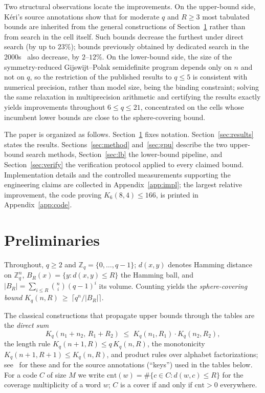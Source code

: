 \documentclass[11pt]{amsart}
\newcommand{\Kq}[3]{K_{#1}(#2,#3)}
\newcommand{\Zq}{\mathbb{Z}_q}
\begin{document}
Two structural observations locate the improvements. On the upper-bound
side, K\'eri's source annotations show that for moderate $q$ and $R\ge 3$
most tabulated bounds are inherited from the general constructions of
Section~\ref{sec:prelim} rather than from search in the cell itself. Such
bounds decrease the furthest under direct search (by up to $23\%$); bounds
previously obtained by dedicated search in the
2000s~\cite{KeriOstergard2005} also decrease, by $2$--$12\%$. On the lower-bound side, the size of the symmetry-reduced
Gijswijt--Polak semidefinite program depends only on $n$ and not on $q$, so
the restriction of the published results to $q\le 5$ is consistent with
numerical precision, rather than model size, being the binding
constraint; solving the same relaxation in
multiprecision arithmetic and certifying the results exactly yields
improvements throughout $6\le q\le 21$, concentrated on the cells whose
incumbent lower bounds are close to the sphere-covering bound.

The paper is organized as follows. Section~\ref{sec:prelim} fixes notation.
Section~\ref{sec:results} states the results.
Sections~\ref{sec:method} and~\ref{sec:gpu} describe the two upper-bound
search methods, Section~\ref{sec:lb} the lower-bound pipeline, and
Section~\ref{sec:verify} the verification protocol applied to every claimed
bound. Implementation details and the controlled measurements supporting
the engineering claims are collected in Appendix~\ref{app:impl}; the
largest relative improvement, the code proving $\Kq{6}{8}{4}\le 166$, is
printed in Appendix~\ref{app:code}.

\section{Preliminaries}\label{sec:prelim}

Throughout, $q\ge 2$ and $\Zq=\{0,\dots,q-1\}$; $d(x,y)$ denotes Hamming
distance on $\Zq^n$, $B_R(x)=\{y: d(x,y)\le R\}$ the Hamming ball, and
$|B_R|=\sum_{i\le R}\binom{n}{i}(q-1)^i$ its volume. Counting yields the
\emph{sphere-covering bound}
$K_q(n,R)\ \ge\ \lceil q^n/|B_R|\rceil$.

The classical constructions that propagate upper bounds through the tables
are the \emph{direct sum}
\begin{equation}\label{eq:directsum}
K_q(n_1+n_2,\,R_1+R_2)\;\le\;K_q(n_1,R_1)\cdot K_q(n_2,R_2),
\end{equation}
the length rule $K_q(n+1,R)\le q\,K_q(n,R)$, the monotonicity
$K_q(n+1,R+1)\le K_q(n,R)$, and product rules over alphabet factorizations;
see~\cite{CHLL,Keri} for these and for the source annotations (``keys'')
used in the tables below. For a code $C$ of size $M$ we write
$\mathrm{cnt}(w)=\#\{c\in C: d(w,c)\le R\}$ for the coverage multiplicity
of a word $w$; $C$ is a cover if and only if $\mathrm{cnt}>0$ everywhere.
\end{document}
